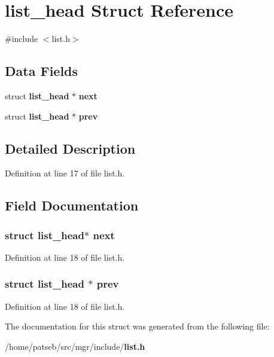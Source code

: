 \section{list\-\_\-head Struct Reference}
\label{structlist__head}


{\ttfamily \#include $<$list.\-h$>$}

\subsection*{Data Fields}
\begin{DoxyCompactItemize}
\item 
struct {\bf list\-\_\-head} $\ast$ {\bf next}
\item 
struct {\bf list\-\_\-head} $\ast$ {\bf prev}
\end{DoxyCompactItemize}


\subsection{Detailed Description}


Definition at line 17 of file list.\-h.



\subsection{Field Documentation}
\subsubsection[{next}]{\setlength{\rightskip}{0pt plus 5cm}struct {\bf list\-\_\-head}$\ast$ {\bf next}}\label{structlist__head_ad6116fd07816a828c3a9830f54871bd0}


Definition at line 18 of file list.\-h.

\subsubsection[{prev}]{\setlength{\rightskip}{0pt plus 5cm}struct {\bf list\-\_\-head} $\ast$ {\bf prev}}\label{structlist__head_ad8f06cb209b17c3a4a5b24cad8793f72}


Definition at line 18 of file list.\-h.



The documentation for this struct was generated from the following file\-:\begin{DoxyCompactItemize}
\item 
/home/patseb/src/mgr/include/{\bf list.\-h}\end{DoxyCompactItemize}
